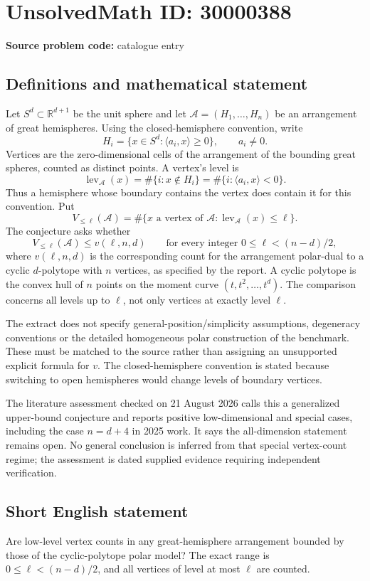 \documentclass[11pt]{article}
\newcommand{\R}{\mathbb{R}}
\begin{document}
\section*{UnsolvedMath ID: 30000388}
\textbf{Source problem code:} catalogue entry
\subsection{Definitions and mathematical statement}
Let $S^d\subset\R^{d+1}$ be the unit sphere and let $\mathcal A=(H_1,\ldots,H_n)$ be an arrangement of great hemispheres. Using the closed-hemisphere convention, write
\[
 H_i=\{x\in S^d:\langle a_i,x\rangle\ge0\},\qquad a_i\ne0.
\]
Vertices are the zero-dimensional cells of the arrangement of the bounding great spheres, counted as distinct points. A vertex's level is
\[
 \operatorname{lev}_{\mathcal A}(x)
 =\#\{i:x\notin H_i\}=\#\{i:\langle a_i,x\rangle<0\}.
\]
Thus a hemisphere whose boundary contains the vertex does contain it for this convention. Put
\[
 V_{\le\ell}(\mathcal A)
 =\#\{x\text{ a vertex of }\mathcal A:
                     \operatorname{lev}_{\mathcal A}(x)\le\ell\}.
\]
The conjecture asks whether
\[
 V_{\le\ell}(\mathcal A)\le v(\ell,n,d)
 \qquad\text{for every integer }0\le\ell<(n-d)/2,
\]
where $v(\ell,n,d)$ is the corresponding count for the arrangement polar-dual to a cyclic $d$-polytope with $n$ vertices, as specified by the report. A cyclic polytope is the convex hull of $n$ points on the moment curve $(t,t^2,\ldots,t^d)$. The comparison concerns all levels up to $\ell$, not only vertices at exactly level $\ell$.

The extract does not specify general-position/simplicity assumptions, degeneracy conventions or the detailed homogeneous polar construction of the benchmark. These must be matched to the source rather than assigning an unsupported explicit formula for $v$. The closed-hemisphere convention is stated because switching to open hemispheres would change levels of boundary vertices.

The literature assessment checked on 21 August 2026 calls this a generalized upper-bound conjecture and reports positive low-dimensional and special cases, including the case $n=d+4$ in 2025 work. It says the all-dimension statement remains open. No general conclusion is inferred from that special vertex-count regime; the assessment is dated supplied evidence requiring independent verification.
\subsection{Short English statement}
Are low-level vertex counts in any great-hemisphere arrangement bounded by those of the cyclic-polytope polar model? The exact range is $0\le\ell<(n-d)/2$, and all vertices of level at most $\ell$ are counted.
\end{document}
